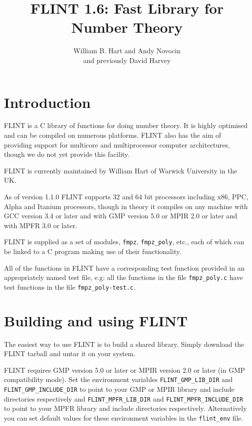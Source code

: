 \documentclass[a4paper,10pt]{article}
\title{FLINT 1.6: Fast Library for Number Theory}
\author{William B. Hart and Andy Novocin \\ and previously David Harvey}
\newcommand{\code}{\lstinline}
\begin{document}
\maketitle
\tableofcontents
\lstset{language=c}
\lstset{basicstyle=\ttfamily}
\lstset{keywordstyle=}
\lstset{escapeinside=\%\%}

\section{Introduction}

FLINT is a C library of functions for doing number theory. It is highly optimised and can be compiled on
numerous platforms. FLINT also has the aim of providing support for multicore and multiprocessor computer 
architectures, though we do not yet provide this facility.

FLINT is currently maintained by William Hart of Warwick University in the UK.

As of version 1.1.0 FLINT supports 32 and 64 bit processors including x86, PPC, Alpha and Itanium processors, 
though in theory it compiles on any machine with GCC version 3.4 or later and with GMP version 5.0 or 
MPIR 2.0 or later and with MPFR 3.0 or later.

FLINT is supplied as a set of modules, \code{fmpz}, \code{fmpz_poly}, etc., each of which can be linked to 
a C program making use of their functionality. 

All of the functions in FLINT have a corresponding test function provided in an appropriately named test 
file, e.g: all the functions in the file \code{fmpz_poly.c} have test functions in the file 
\code{fmpz_poly-test.c}.

\section{Building and using FLINT}

The easiest way to use FLINT is to build a shared library. Simply download the FLINT tarball and untar it
on your system.

FLINT requires GMP version 5.0 or later or MPIR version 2.0 or later (in GMP compatibility mode). Set the 
environment variables \code{FLINT_GMP_LIB_DIR} and \code{FLINT_GMP_INCLUDE_DIR} to point to your GMP or 
MPIR library and include directories respectively and \code{FLINT_MPFR_LIB_DIR} and 
\code{FLINT_MPFR_INCLUDE_DIR} to point to your MPFR library and include directories respectively. 
Alternatively you can set default values for these environment variables in the \code{flint_env} file.
\end{document}
